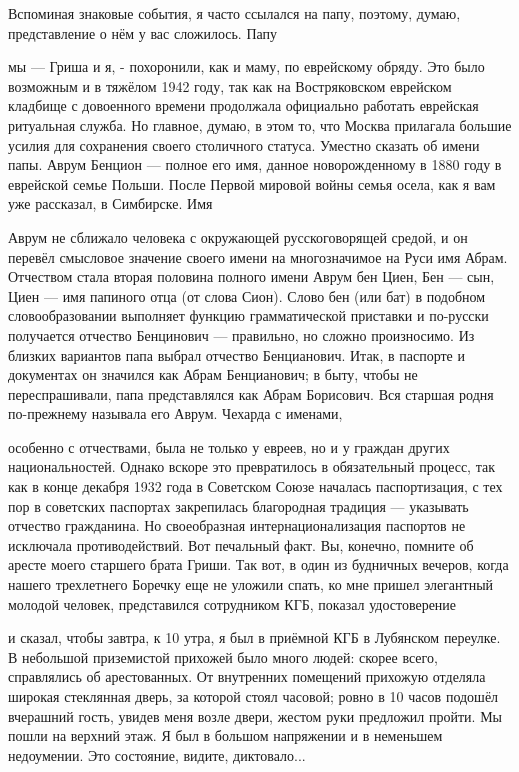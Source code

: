 

\label{253-2}
Вспоминая знаковые события, я часто ссылался на папу, поэтому, думаю, представление о нём у вас сложилось. Папу

\label{254-1}
мы — Гриша и я, - похоронили, как и маму, по еврейскому обряду. Это было возможным и в тяжёлом 1942 году, так как на Востряковском еврейском кладбище с довоенного времени продолжала официально работать еврейская ритуальная служба. Но главное, думаю, в этом то, что Москва прилагала большие усилия для сохранения своего столичного статуса. 
Уместно сказать об имени папы. Аврум Бенцион — полное его имя, данное новорожденному в 1880 году в еврейской семье Польши. После Первой мировой войны семья осела, как я вам уже рассказал, в Симбирске. Имя 

\label{255-1}
Аврум не сближало человека с окружающей русскоговорящей средой, и он перевёл смысловое значение своего имени на многозначимое на Руси имя Абрам. Отчеством стала вторая половина полного имени Аврум бен Циен, Бен — сын, Циен — имя папиного отца (от слова Сион). Слово бен (или бат) в подобном словообразовании выполняет функцию грамматической приставки и по-русски получается отчество Бенцинович — правильно, но сложно произносимо. Из близких вариантов папа выбрал отчество Бенцианович.
Итак, в паспорте и документах он значился как Абрам Бенцианович; в быту, чтобы не переспрашивали, папа представлялся как Абрам Борисович. Вся старшая родня по-прежнему называла его Аврум. Чехарда с именами,

\label{256-1}
особенно с отчествами, была не только у евреев, но и у граждан других национальностей. Однако вскоре это превратилось в обязательный процесс, так как в конце декабря 1932 года в Советском Союзе началась паспортизация, с тех пор в советских паспортах закрепилась благородная традиция — указывать отчество гражданина. Но своеобразная интернационализация паспортов не исключала противодействий. Вот печальный факт. Вы, конечно, помните об аресте моего старшего брата Гриши. Так вот, в один из будничных вечеров, когда нашего трехлетнего Боречку еще не уложили спать, ко мне пришел элегантный молодой человек, представился сотрудником КГБ, показал удостоверение

\label{257-1}
и сказал, чтобы завтра, к 10 утра, я был в приёмной КГБ в Лубянском переулке. В небольшой приземистой прихожей было много людей: скорее всего, справлялись об арестованных. От внутренних помещений прихожую отделяла широкая стеклянная дверь, за которой стоял часовой; ровно в 10 часов подошёл вчерашний гость, увидев меня возле двери, жестом руки предложил пройти. Мы пошли на верхний этаж. Я был в большом напряжении и в неменьшем недоумении. Это состояние, видите, диктовало...

